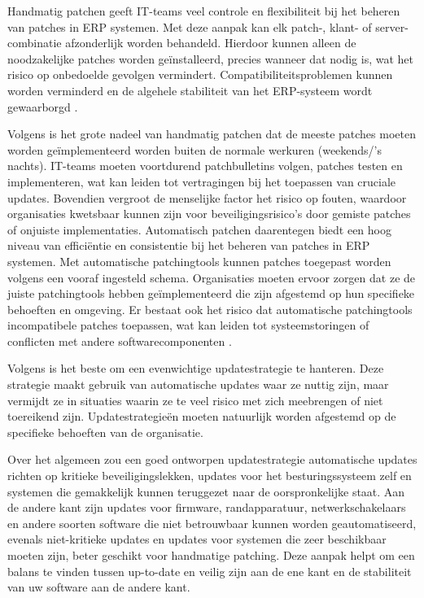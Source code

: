 Handmatig patchen geeft IT-teams veel controle en flexibiliteit bij het beheren van patches in ERP systemen. Met deze aanpak kan elk patch-, klant- of server-combinatie afzonderlijk worden behandeld. Hierdoor kunnen alleen de 
noodzakelijke patches worden geïnstalleerd, precies wanneer dat nodig is, wat het risico op onbedoelde gevolgen vermindert. Compatibiliteitsproblemen kunnen worden verminderd en de algehele stabiliteit van het ERP-systeem wordt gewaarborgd \autocite{Hooper2018}.

Volgens \textcite{Hooper2018} is het grote nadeel van handmatig patchen dat de meeste patches moeten worden geïmplementeerd worden buiten de normale werkuren (weekends/'s nachts). IT-teams moeten voortdurend patchbulletins volgen, patches testen en implementeren, wat kan leiden tot vertragingen bij het 
toepassen van cruciale updates. Bovendien vergroot de menselijke factor het risico op fouten, waardoor organisaties kwetsbaar kunnen zijn voor beveiligingsrisico’s door gemiste patches of onjuiste implementaties. Automatisch patchen daarentegen biedt een hoog niveau van efficiëntie en consistentie bij het beheren van patches in ERP systemen. Met automatische patchingtools
kunnen patches toegepast worden volgens een vooraf ingesteld schema. Organisaties moeten ervoor zorgen dat ze de juiste patchingtools hebben geïmplementeerd die zijn afgestemd op hun specifieke behoeften en omgeving. Er bestaat ook het risico dat automatische patchingtools incompatibele patches toepassen, wat kan leiden tot systeemstoringen of conflicten met andere softwarecomponenten \autocite{Hooper2018}.

Volgens \textcite{Tozzi2017} is het beste om een evenwichtige updatestrategie te hanteren. Deze strategie maakt gebruik van automatische updates waar ze nuttig zijn, maar vermijdt ze in situaties waarin ze te veel risico met zich meebrengen
 of niet toereikend zijn. Updatestrategieën moeten natuurlijk worden afgestemd op de specifieke behoeften van de organisatie.

Over het algemeen zou een goed ontworpen updatestrategie automatische updates richten op kritieke beveiligingslekken, updates voor het besturingssysteem zelf en systemen die gemakkelijk kunnen teruggezet naar de oorspronkelijke staat. Aan de andere kant 
zijn updates voor firmware, randapparatuur, netwerkschakelaars en andere soorten software die niet betrouwbaar kunnen worden geautomatiseerd, evenals niet-kritieke updates en updates voor systemen die zeer beschikbaar moeten zijn, beter geschikt voor handmatige patching.
Deze aanpak helpt om een balans te vinden tussen up-to-date en veilig zijn aan de ene kant en de stabiliteit van uw software aan de andere kant.

